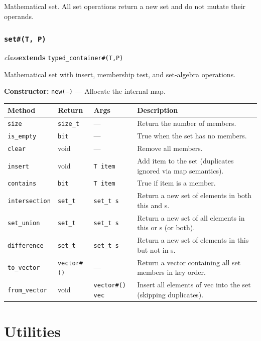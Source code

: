 \documentclass[11pt,letterpaper]{report}
\begin{document}
Mathematical set. All set operations return a new set and do not mutate their operands.

\subsection*{\texttt{set\#(T, P)}}
\noindent\small\textit{class}\quad \textbf{extends} \texttt{typed\_container\#(T,P)}\par

Mathematical set with insert, membership test, and set-algebra operations.

\noindent\textbf{Constructor:} \texttt{new(---)} --- Allocate the internal map.

\begin{xltabular}{\linewidth}{>{\small}p{1.35in} >{\small}p{1.25in} >{\small}p{0.95in} >{\small}X}
\toprule
\textbf{Method} & \textbf{Return} & \textbf{Args} & \textbf{Description} \\
\midrule
\endhead
\bottomrule
\endfoot
\texttt{size} & \texttt{size\_t} & --- & Return the number of members. \\
\texttt{is\_empty} & \texttt{bit} & --- & True when the set has no members. \\
\texttt{clear} & void & --- & Remove all members. \\
\texttt{insert} & void & \texttt{T item} & Add item to the set (duplicates ignored via map semantics). \\
\texttt{contains} & \texttt{bit} & \texttt{T item} & True if item is a member. \\
\texttt{intersection} & \texttt{set\_t} & \texttt{set\_t s} & Return a new set of elements in both this and s. \\
\texttt{set\_union} & \texttt{set\_t} & \texttt{set\_t s} & Return a new set of all elements in this or s (or both). \\
\texttt{difference} & \texttt{set\_t} & \texttt{set\_t s} & Return a new set of elements in this but not in s. \\
\texttt{to\_vector} & \texttt{vector\#()} & --- & Return a vector containing all set members in key order. \\
\texttt{from\_vector} & void & \texttt{vector\#() vec} & Insert all elements of vec into the set (skipping duplicates). \\
\end{xltabular}

\chapter{Utilities}
\end{document}
